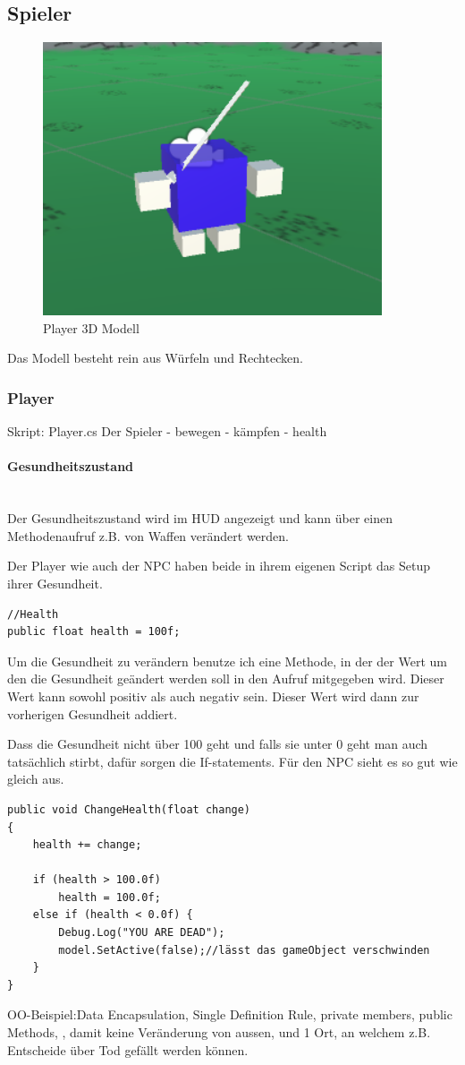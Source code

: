 \subsection{Spieler}

\begin{figure}[H]
\includegraphics[scale=1]{screenshots/player.png}
\caption{Player 3D Modell}
\end{figure}

Das Modell besteht rein aus Würfeln und Rechtecken.


\subsubsection{Player}
Skript: Player.cs
Der Spieler
- bewegen
- kämpfen
- health

\paragraph{Gesundheitszustand}\mbox{} \\
Der Gesundheitszustand wird im HUD angezeigt und kann über einen Methodenaufruf z.B. von Waffen verändert werden.

Der Player wie auch der NPC haben beide in ihrem eigenen Script das Setup ihrer Gesundheit.
\begin{lstlisting}
//Health
public float health = 100f;
\end{lstlisting}
Um die Gesundheit zu verändern benutze ich eine Methode, in der der Wert um den die Gesundheit geändert werden soll in den Aufruf mitgegeben wird. Dieser Wert kann sowohl positiv als auch negativ sein.
Dieser Wert wird dann zur vorherigen Gesundheit addiert.


Dass die Gesundheit nicht über 100 geht und falls sie unter 0 geht man auch tatsächlich stirbt, dafür sorgen die If-statements. Für den NPC sieht es so gut wie gleich aus.
\begin{lstlisting}
public void ChangeHealth(float change)
{
	health += change;

	if (health > 100.0f)
		health = 100.0f;
	else if (health < 0.0f) {
		Debug.Log("YOU ARE DEAD");
		model.SetActive(false);//lässt das gameObject verschwinden
	}
}
\end{lstlisting}
OO-Beispiel:Data Encapsulation, Single Definition Rule, private members, public Methods, , damit keine Veränderung von aussen, und 1 Ort, an welchem z.B. Entscheide über Tod gefällt werden können.

